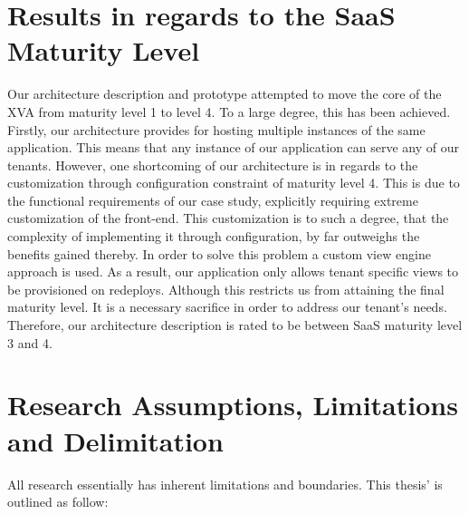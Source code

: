 \section{Results in regards to the SaaS Maturity Level}

Our architecture description and prototype attempted to move the core of the XVA from maturity level 1 to level 4. To a large degree, this has been achieved. Firstly, our architecture provides for hosting multiple instances of the same application. This means that any instance of our application can serve any of our tenants. However, one shortcoming of our architecture is in regards to the customization through configuration constraint of maturity level 4. This is due to the functional requirements of our case study, explicitly requiring extreme customization of the front-end.  This customization is to such a degree, that the complexity of implementing it through configuration, by far outweighs the benefits gained thereby. In order to solve this problem a custom view engine approach is used. As a result, our application only allows tenant specific views to be provisioned on redeploys. Although this restricts us from attaining the final maturity level. It is a necessary sacrifice in order to address our tenant's needs. Therefore, our architecture description is rated to be between SaaS maturity level 3 and 4. 

\section{Research Assumptions, Limitations and Delimitation}
All research essentially has inherent limitations and boundaries. This thesis' is outlined as follow:

